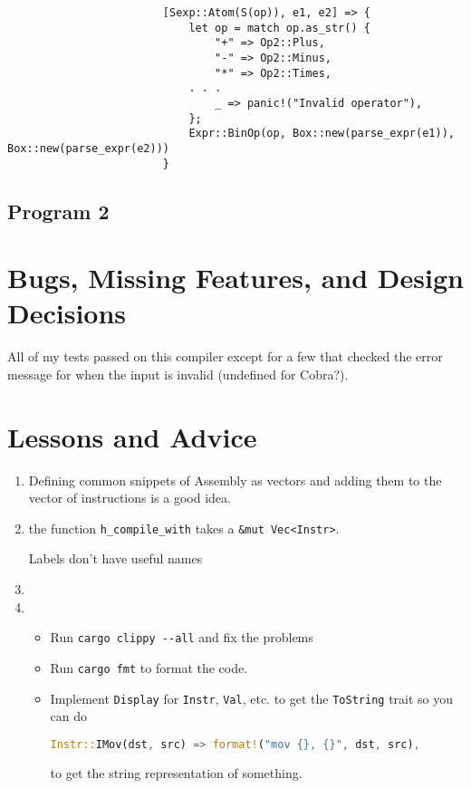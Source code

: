 \begin{enumerate}
\begin{itemize}
					\begin{lstlisting}
						[Sexp::Atom(S(op)), e1, e2] => {
						    let op = match op.as_str() {
						        "+" => Op2::Plus,
						        "-" => Op2::Minus,
						        "*" => Op2::Times,
							. . .
						        _ => panic!("Invalid operator"),
						    };
						    Expr::BinOp(op, Box::new(parse_expr(e1)), Box::new(parse_expr(e2)))
						}
					\end{lstlisting}
			\end{itemize}
	\end{enumerate}

	\subsection{Program 2}

	\section{Bugs, Missing Features, and Design Decisions}

	All of my tests passed on this compiler except for a few that checked the error message for when the input is invalid (undefined for Cobra?). 

	\section{Lessons and Advice}

	\begin{enumerate}
		\item Defining common snippets of Assembly as vectors and adding them to the vector of instructions is a good idea.
		\item the function \verb|h_compile_with| takes a \verb|&mut Vec<Instr>|.

			Labels don't have useful names

		\item
		\item 
			\begin{itemize}
				\item Run \verb|cargo clippy --all| and fix the problems
				\item Run \verb|cargo fmt| to format the code.
				\item Implement \verb|Display| for \verb|Instr|, \verb|Val|, etc. to get the \verb|ToString| trait so you can do
					\begin{lstlisting}[language=Rust, numbers=none, frame=none]
        					Instr::IMov(dst, src) => format!("mov {}, {}", dst, src),
					\end{lstlisting}
					to get the string representation of something.
			\end{itemize}

	\end{enumerate}

